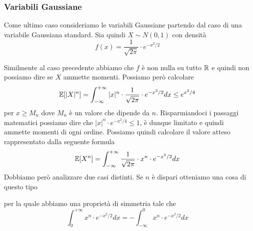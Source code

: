 \subsubsection{Variabili Gaussiane}
Come ultimo caso consideriamo le variabili Gaussiane partendo dal caso di una variabile Gaussiana
standard. Sia quindi $X \sim N(0,1)$ con densità
\[ f(x) = \frac{1}{\sqrt{2 \pi}} \cdot e^{-x^2 / 2} \]
\begin{center}
\end{center}
Similmente al caso precedente abbiamo che $f$ è non nulla su tutto $\mathbb{R}$ e quindi non possiamo dire
se $X$ ammette momenti. Possiamo però calcolare
\[
	\mathbb{E}[|X|^n] = \int_{-\infty}^{+\infty} |x|^n \cdot
	\frac{1}{\sqrt{2 \pi}} \cdot e^{-x^2 / 2} dx \leq e^{x^2 / 4}
\]
per $x \geq M_n$ dove $M_n$ è un valore che dipende da $n$. Risparmiandoci i passaggi matematici
possiamo dire che $|x|^n \cdot e^{-x^2 / 4} \leq 1$, è dunque limitato e quindi ammette momenti di
ogni ordine. Possiamo quindi calcolare il valore atteso rappresentato dalla seguente formula
\[ \mathbb{E}[X^n] = \int_{-\infty}^{+\infty} \frac{1}{\sqrt{2 \pi}} \cdot x^n \cdot e^{-x^2 / 2} dx \]
Dobbiamo però analizzare due casi distinti. Se $n$ è dispari otteniamo una cosa di questo tipo
\begin{center}
\end{center}
per la quale abbiamo una proprietà di simmetria tale che
\[ \int_{0}^{+\infty} x^n \cdot e^{-x^2/2} dx = - \int_{-\infty}^{0} x^n \cdot e^{-x^2/2} dx \]
